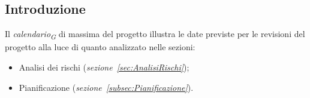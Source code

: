 \subsection{Introduzione}
Il \textit{calendario}\textsubscript{\textit{G}} di massima del progetto illustra le date previste per le revisioni del progetto
alla luce di quanto analizzato nelle sezioni: 
\begin{itemize}
    \item Analisi dei rischi (\textit{sezione~\ref{sec:AnalisiRischi}});
    \item Pianificazione (\textit{sezione~\ref{subsec:Pianificazione}}).
\end{itemize}